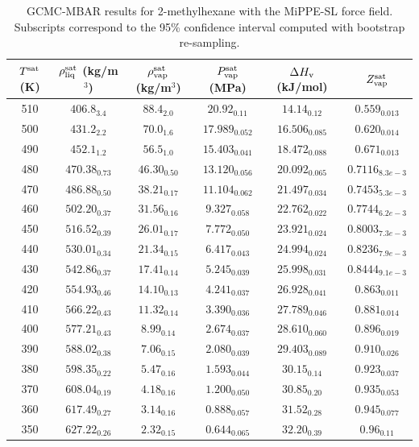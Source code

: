 \documentclass[journal=jctc,manuscript=article]{achemso}
\begin{document}
\begin{table}[htb!]
	\caption{GCMC-MBAR results for 2-methylhexane with the MiPPE-SL force field. Subscripts correspond to the 95\% confidence interval computed with bootstrap re-sampling.}
	\begin{center}
		\begin{tabular}{|c|c|c|c|c|c|}
			\hline
			$T^{\rm sat}$ (K) & $\rho_{\rm liq}^{\rm sat}$ (kg/m$^3$) & $\rho_{\rm vap}^{\rm sat}$ (kg/m$^3$) & $P_{\rm vap}^{\rm sat}$ (MPa) & $\Delta H_{\rm v}$ (kJ/mol) & $Z_{\rm vap}^{\rm sat}$ \\ \hline
			510 & $406.8_{3.4}$ & $88.4_{2.0}$ & $20.92_{0.11}$ & $14.14_{0.12}$ & $0.559_{0.013}$ \\
			500 & $431.2_{2.2}$ & $70.0_{1.6}$ & $17.989_{0.052}$ & $16.506_{0.085}$ & $0.620_{0.014}$ \\
			490 & $452.1_{1.2}$ & $56.5_{1.0}$ & $15.403_{0.041}$ & $18.472_{0.088}$ & $0.671_{0.013}$ \\
			480 & $470.38_{0.73}$ & $46.30_{0.50}$ & $13.120_{0.056}$ & $20.092_{0.065}$ & $0.7116_{8.3e-3}$ \\
			470 & $486.88_{0.50}$ & $38.21_{0.17}$ & $11.104_{0.062}$ & $21.497_{0.034}$ & $0.7453_{5.3e-3}$ \\
			460 & $502.20_{0.37}$ & $31.56_{0.16}$ & $9.327_{0.058}$ & $22.762_{0.022}$ & $0.7744_{6.2e-3}$ \\
			450 & $516.52_{0.39}$ & $26.01_{0.17}$ & $7.772_{0.050}$ & $23.921_{0.024}$ & $0.8003_{7.3e-3}$ \\
			440 & $530.01_{0.34}$ & $21.34_{0.15}$ & $6.417_{0.043}$ & $24.994_{0.024}$ & $0.8236_{7.9e-3}$ \\
			430 & $542.86_{0.37}$ & $17.41_{0.14}$ & $5.245_{0.039}$ & $25.998_{0.031}$ & $0.8444_{9.1e-3}$ \\
			420 & $554.93_{0.46}$ & $14.10_{0.13}$ & $4.241_{0.037}$ & $26.928_{0.041}$ & $0.863_{0.011}$ \\
			410 & $566.22_{0.43}$ & $11.32_{0.14}$ & $3.390_{0.036}$ & $27.789_{0.046}$ & $0.881_{0.014}$ \\
			400 & $577.21_{0.43}$ & $8.99_{0.14}$ & $2.674_{0.037}$ & $28.610_{0.060}$ & $0.896_{0.019}$ \\
			390 & $588.02_{0.38}$ & $7.06_{0.15}$ & $2.080_{0.039}$ & $29.403_{0.089}$ & $0.910_{0.026}$ \\
			380 & $598.35_{0.22}$ & $5.47_{0.16}$ & $1.593_{0.044}$ & $30.15_{0.14}$ & $0.923_{0.037}$ \\
			370 & $608.04_{0.19}$ & $4.18_{0.16}$ & $1.200_{0.050}$ & $30.85_{0.20}$ & $0.935_{0.053}$ \\
			360 & $617.49_{0.27}$ & $3.14_{0.16}$ & $0.888_{0.057}$ & $31.52_{0.28}$ & $0.945_{0.077}$ \\
			350 & $627.22_{0.26}$ & $2.32_{0.15}$ & $0.644_{0.065}$ & $32.20_{0.39}$ & $0.96_{0.11}$ \\
			\hline
		\end{tabular}
	\end{center}
\end{table}
\end{document}
